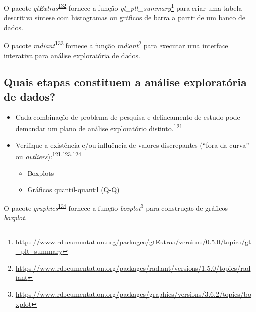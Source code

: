 \documentclass[
  a4paper,
]{book}
\renewcommand{\href}[2]{#2\footnote{\url{#1}}}
\newenvironment{infobox}[1]
  {
  \begin{itemize}
  \renewcommand{\labelitemi}{
    \raisebox{-.7\height}[0pt][0pt]{
      {\setkeys{Gin}{width=3em,keepaspectratio}
        \texttt{[image: \#1]}}
    }
  }
  \setlength{\fboxsep}{1em}
  \begin{blackbox}
  \item
  }
  {
  \end{blackbox}
  \end{itemize}
  }
\begin{document}
\begin{infobox}{images/Rlogo}
O pacote \emph{gtExtras}\textsuperscript{\protect\hyperlink{ref-gtExtras}{132}} fornece a função \href{https://www.rdocumentation.org/packages/gtExtras/versions/0.5.0/topics/gt_plt_summary}{\emph{gt\_plt\_summary}} para criar uma tabela descritiva síntese com histogramas ou gráficos de barra a partir de um banco de dados.

\end{infobox}

\begin{infobox}{images/Rlogo}
O pacote \emph{radiant}\textsuperscript{\protect\hyperlink{ref-radiant}{133}} fornece a função \href{https://www.rdocumentation.org/packages/radiant/versions/1.5.0/topics/radiant}{\emph{radiant}} para executar uma interface interativa para análise exploratória de dados.

\end{infobox}

\hypertarget{quais-etapas-constituem-a-anuxe1lise-exploratuxf3ria-de-dados}{%
\subsection{Quais etapas constituem a análise exploratória de dados?}\label{quais-etapas-constituem-a-anuxe1lise-exploratuxf3ria-de-dados}}

\begin{itemize}
\item
  Cada combinação de problema de pesquisa e delineamento de estudo pode demandar um plano de análise exploratório distinto.\textsuperscript{\protect\hyperlink{ref-zuur2009}{121}}
\item
  Verifique a existência e/ou influência de valores discrepantes (``fora da curva'' ou \emph{outliers}):\textsuperscript{\protect\hyperlink{ref-zuur2009}{121},\protect\hyperlink{ref-chatfield1986}{123},\protect\hyperlink{ref-Ferketich1986}{124}}

  \begin{itemize}
  \item
    Boxplots
  \item
    Gráficos quantil-quantil (Q-Q)
  \end{itemize}
\end{itemize}

\begin{infobox}{images/Rlogo}
O pacote \emph{graphics}\textsuperscript{\protect\hyperlink{ref-graphics}{134}} fornece a função \href{https://www.rdocumentation.org/packages/graphics/versions/3.6.2/topics/boxplot}{\emph{boxplot}} para construção de gráficos \emph{boxplot}.

\end{infobox}
\end{document}
